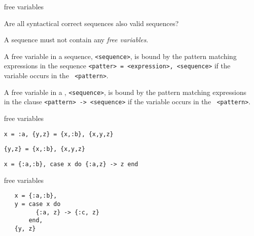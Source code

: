 \begin{frame}{free variables}

Are all syntactical correct sequences also valid sequences?

\pause\vspace{20pt}

A sequence must not contain any {\em free variables}.

\pause\vspace{10pt}

A free variable in a sequence, {\tt <sequence>}, is bound by the
pattern matching expressions in the sequence {\tt <patter> =
<expression>, <sequence>} if the variable occurs in the {\tt
<pattern>}.

\pause\vspace{10pt}

A free variable in a , {\tt <sequence>}, is bound by the
pattern matching expressions in the clause {\tt <pattern> -> <sequence>} if the variable occurs in the {\tt
<pattern>}.


\end{frame}

\begin{frame}{free variables}

{\tt x = :a, \{y,z\} = \{x,:b\}, \{x,y,z\}}

\pause\vspace{20pt}

{\tt \{y,z\} = \{x,:b\}, \{x,y,z\}}


\pause\vspace{20pt}


{\tt x = \{:a,:b\}, case x do \{:a,z\} -> z end}

\end{frame}


\begin{frame}[fragile]{free variables}

\vspace{20pt}

\hspace{20pt}
\begin{verbatim}
   x = {:a,:b},
   y = case x do
         {:a, z} -> {:c, z}
       end,
   {y, z}
\end{verbatim}


\end{frame}


